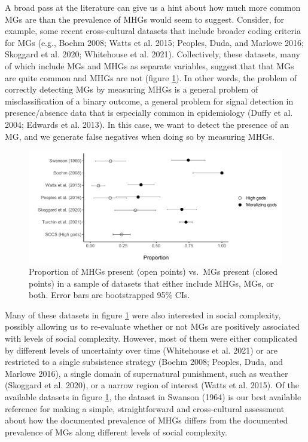 \documentclass[
]{article}
\begin{document}
A broad pass at the literature can give us a hint about how much more common MGs are than the prevalence of MHGs would seem to suggest. Consider, for example, some recent cross-cultural datasets that include broader coding criteria for MGs (e.g., Boehm 2008; Watts et al. 2015; Peoples, Duda, and Marlowe 2016; Skoggard et al. 2020; Whitehouse et al. 2021). Collectively, these datasets, many of which include MGs and MHGs as separate variables, suggest that that MGs are quite common and MHGs are not (figure \ref{fig:comparedatasets}). In other words, the problem of correctly detecting MGs by measuring MHGs is a general problem of misclassification of a binary outcome, a general problem for signal detection in presence/absence data that is especially common in epidemiology (Duffy et al. 2004; Edwards et al. 2013). In this case, we want to detect the presence of an MG, and we generate false negatives when doing so by measuring MHGs.

\begin{figure}
\centering
\includegraphics{mhg-writeup_files/figure-latex/comparedatasets-1.pdf}
\caption{\label{fig:comparedatasets}Proportion of MHGs present (open points) vs.~MGs present (closed points) in a sample of datasets that either include MHGs, MGs, or both. Error bars are bootstrapped 95\% CIs.}
\end{figure}

Many of these datasets in figure \ref{fig:comparedatasets} were also interested in social complexity, possibly allowing us to re-evaluate whether or not MGs are positively associated with levels of social complexity. However, most of them were either complicated by different levels of uncertainty over time (Whitehouse et al. 2021) or are restricted to a single subsistence strategy (Boehm 2008; Peoples, Duda, and Marlowe 2016), a single domain of supernatural punishment, such as weather (Skoggard et al. 2020), or a narrow region of interest (Watts et al. 2015). Of the available datasets in figure \ref{fig:comparedatasets}, the dataset in Swanson (1964) is our best available reference for making a simple, straightforward and cross-cultural assessment about how the documented prevalence of MHGs differs from the documented prevalence of MGs along different levels of social complexity.
\end{document}
